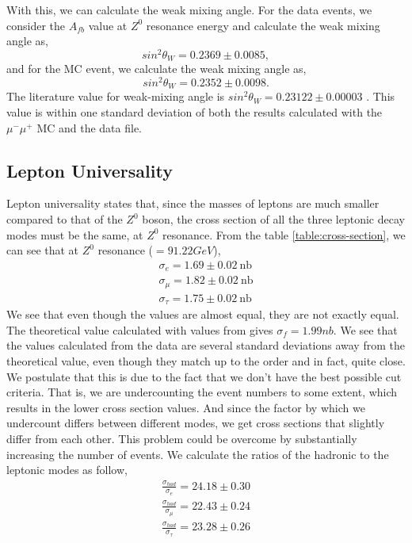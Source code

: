 With this, we can calculate the weak mixing angle. For the data events, we consider the $A_{fb}$ value at $Z^0$ resonance energy and calculate the weak mixing angle as,
\begin{equation}
    sin^2\theta_W = 0.2369 \pm 0.0085,
\end{equation}
and for the MC event, we calculate the weak mixing angle as,
\begin{equation}
    sin^2\theta_W = 0.2352 \pm 0.0098.
\end{equation}
The literature value for weak-mixing angle is $sin^2\theta_W = 0.23122 \pm 0.00003$ \cite{pdg-ew}. This value is within one standard deviation of both the results calculated with the $\mu^-\mu^+$ MC and the data file.

\subsection{Lepton Universality}
Lepton universality states that, since the masses of leptons are much smaller compared to that of the $Z^0$ boson, the cross section of all the three leptonic decay modes must be the same, at $Z^0$ resonance. From the table \ref{table:cross-section}, we can see that at $Z^0$ resonance ($=91.22 GeV$),
\begin{equation}
\begin{split}
    \sigma_e = 1.69 \pm 0.02 ~ \text{nb} \\
    \sigma_{\mu} = 1.82 \pm 0.02 ~ \text{nb} \\
    \sigma_{\tau} = 1.75 \pm 0.02 ~ \text{nb}
\end{split}
\end{equation}
We see that even though the values are almost equal, they are not exactly equal. The theoretical value calculated with values from \cite{UB} gives $\sigma_f = 1.99 nb$. We see that the values calculated from the data are several standard deviations away from the theoretical value, even though they match up to the order and in fact, quite close. We postulate that this is due to the fact that we don't have the best possible cut criteria. That is, we are undercounting the event numbers to some extent, which results in the lower cross section values. And since the factor by which we undercount differs between different modes, we get cross sections that slightly differ from each other. This problem could be overcome by substantially increasing the number of events. We calculate the ratios of the hadronic to the leptonic modes as follow,
\begin{equation}
\begin{split}
    \frac{\sigma_{had}}{\sigma_e} = 24.18 \pm 0.30 \\
    \frac{\sigma_{had}}{\sigma_{\mu}} = 22.43 \pm 0.24 \\
    \frac{\sigma_{had}}{\sigma_{\tau}} = 23.28 \pm 0.26
\end{split}
\end{equation}
